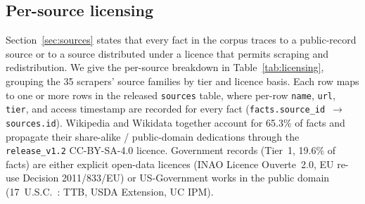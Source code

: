 \subsection{Per-source licensing}
\label{sec:licensing}

Section~\ref{sec:sources} states that every fact in the corpus traces
to a public-record source or to a source distributed under a licence
that permits scraping and redistribution. We give the per-source
breakdown in Table~\ref{tab:licensing}, grouping the
35 scrapers' source families by tier and licence basis. Each row
maps to one or more rows in the released \texttt{sources} table, where
per-row \texttt{name}, \texttt{url}, \texttt{tier}, and access timestamp
are recorded for every fact (\texttt{facts.source\_id}~$\rightarrow$
\texttt{sources.id}). Wikipedia and Wikidata together account for 65.3\%
of facts and propagate their share-alike / public-domain dedications
through the \texttt{release\_v1.2} CC-BY-SA-4.0 licence. Government
records (Tier~1, 19.6\% of facts) are either explicit open-data
licences (INAO Licence Ouverte~2.0, EU re-use Decision 2011/833/EU) or
US-Government works in the public domain
(17~U.S.C.~: TTB, USDA Extension, UC IPM).

